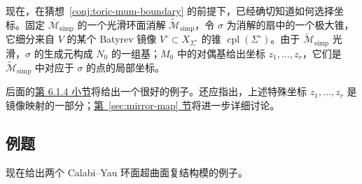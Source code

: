现在，在猜想~\ref{conj:toric-mum-boundary} 的前提下，已经确切知道如何选择坐标。固定 $\overline{\mathcal M}_{\mathrm{simp}}$ 的一个光滑环面消解 $\widetilde{\mathcal M}_{\mathrm{simp}}$，令 $\sigma$ 为消解的扇中的一个极大锥，它细分来自 $V$ 的某个 Batyrev 镜像 $V^\circ\subset X_{\Sigma^\circ}$ 的锥 $\operatorname{cpl}(\Sigma^\circ)$。由于 $\widetilde{\mathcal M}_{\mathrm{simp}}$ 光滑，$\sigma$ 的生成元构成 $N_0$ 的一组基；$M_0$ 中的对偶基给出坐标 $z_1,\ldots,z_r$，它们是 $\widetilde{\mathcal M}_{\mathrm{simp}}$ 中对应于 $\sigma$ 的点的局部坐标。

后面的\hyperref[subsec:two-parameter-moduli]{第 6.1.4 小节}将给出一个很好的例子。还应指出，上述特殊坐标 $z_1,\ldots,z_r$ 是镜像映射的一部分；\hyperref[sec:mirror-map]{第~\ref*{sec:mirror-map} 节}将进一步详细讨论。

\subsection{例题}\label{subsec:two-parameter-moduli}
现在给出两个 Calabi--Yau 环面超曲面复结构模的例子。
